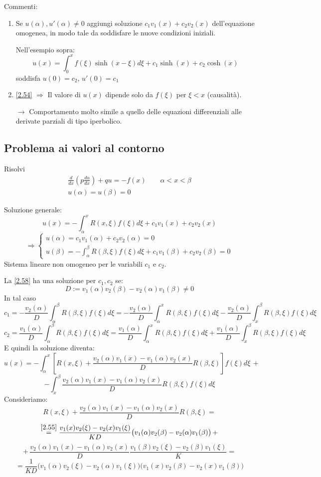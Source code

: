 \documentclass[a4paper,11pt]{report}
\begin{document}
Commenti:
\begin{enumerate}[label=(\roman*)]
\item Se $u(\alpha),u'(\alpha)\neq 0$ aggiungi soluzione $c_1v_1(x)+c_2v_2(x)$ dell'equazione omogenea, in modo tale da soddisfare le nuove condizioni iniziali. 

Nell'esempio sopra:
\[
u(x)=\int_0^x f(\xi)\sinh(x-\xi)d\xi + c_1\sinh(x)+ c_2\cosh(x)
\]
soddisfa $u(0)=c_2$, $u'(0)=c_1$
\item \eqref{2.54} $\Rightarrow$ Il valore di $u(x)$ dipende solo da $f(\xi)$ per  $\xi<x$ (causalit\`a). 

$\rightarrow$ Comportamento molto simile a quello delle equazioni differenziali alle derivate parziali di tipo iperbolico.
\end{enumerate}

\subsection{Problema ai valori al contorno}

Risolvi
\begin{equation}
\begin{gathered}
\frac{d}{dx}\left(p\frac{du}{dx}\right)+qu=-f(x) \qquad \alpha <x<\beta\\
u(\alpha)=u(\beta)=0 
\end{gathered}
\label{2.57}
\end{equation}

Soluzione generale:
\[
u(x)=-\int_\alpha^x R(x,\xi)f(\xi)d\xi + c_1v_1(x)+c_2v_2(x) 
\]
\begin{equation}
\Rightarrow\begin{cases}
u(\alpha)=c_1v_1(\alpha)+c_2v_2(\alpha)=0\\
u(\beta)=-\int_{\alpha}^\beta R(\beta,\xi)f(\xi)d\xi + c_1v_1(\beta)+c_2v_2(\beta)=0
\end{cases}
\label{2.58}
\end{equation}
Sistema lineare non omogeneo per le variabili $c_1$ e $c_2$.

La \eqref{2.58} ha una soluzione per $c_1,c_2$ se:
\[
D:=v_1(\alpha)v_2(\beta)-v_2(\alpha)v_1(\beta)\neq 0
\]
In tal caso
\[
c_1=-\frac{v_2(\alpha)}{D}\int_\alpha^\beta R(\beta,\xi)f(\xi)d\xi= -\frac{v_2(\alpha)}{D}\int_\alpha^x R(\beta,\xi)f(\xi)d\xi -\frac{v_2(\alpha)}{D}\int_x^\beta  R(\beta,\xi)f(\xi)d\xi
\]
\[
c_2= \frac{v_1(\alpha)}{D}\int_\alpha^\beta  R(\beta,\xi)f(\xi)d\xi= \frac{v_1(\alpha)}{D}\int_\alpha^x R(\beta,\xi)f(\xi)d\xi +\frac{v_1(\alpha)}{D}\int_x^\beta  R(\beta,\xi)f(\xi)d\xi
\]
E quindi la soluzione diventa:
\[
u(x)=-\int_\alpha^x\left[R(x,\xi)+\frac{v_2(\alpha)v_1(x) - v_1(\alpha)v_2(x)}{D}R(\beta,\xi)\right]f(\xi)d\xi\,+
\]
\[
-\int_x^\beta \frac{v_2(\alpha)v_1(x) - v_1(\alpha)v_2(x)}{D} R(\beta,\xi)f(\xi)d\xi
\]
Consideriamo:
\[
R(x,\xi)+\frac{v_2(\alpha)v_1(x)-v_1(\alpha)v_2(x)}{D}R(\beta,\xi)=
\]
\[
\overset{\eqref{2.55}}{=}\frac{v_1(x)v_2(\xi)-v_2(x)v_1(\xi)}{K D}\big(v_1(\alpha)v_2(\beta)-v_2(\alpha)v_1(\beta)\big)\, +
\]
\[
+\, \frac{v_2(\alpha)v_1(x)-v_1(\alpha)v_2(x)}{D} \frac{v_1(\beta)v_2(\xi)-v_2(\beta)v_1(\xi)}{K}=
\]
\[
=\frac{1}{KD}\big(v_1(\alpha)v_2(\xi)-v_2(\alpha)v_1(\xi)\big) \big(v_1(x)v_2(\beta)-v_2(x)v_1(\beta)\big)
\]
\end{document}
